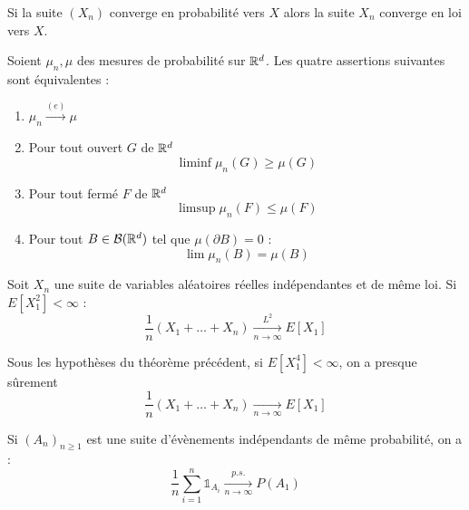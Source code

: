\documentclass{cours}
\begin{document}
        \begin{proposition}
            Si la suite $\left(X_{n}\right)$ converge en probabilité vers $X$ alors la suite $X_{n}$ converge en loi vers $X$. 
        \end{proposition}

        \begin{proposition}
            Soient $\mu_{n}, \mu$ des mesures de probabilité sur $\mathbb{R}^{d}$. Les quatre assertions suivantes sont équivalentes :
            \begin{enumerate}
                \item $\mu_{n} \xrightarrow{(e)} \mu$
                \item Pour tout ouvert $G$ de $\mathbb{R}^{d}$
                \[
                    \liminf \mu_{n}(G) \geq \mu(G)
                \]
                \item Pour tout fermé $F$ de $\mathbb{R}^{d}$
                \[
                    \limsup \mu_{n}(F) \leq \mu(F)
                \]
                \item Pour tout $B \in \mathcal{B}(\mathbb{R}^{d})$ tel que $\mu\left(\partial B\right) = 0$ : 
                \[
                    \lim \mu_{n}(B) = \mu(B)
                \]
            \end{enumerate} 
        \end{proposition}

        \begin{theorem}
            Soit $X_{n}$ une suite de variables aléatoires réelles indépendantes et de même loi. Si $E[X_{1}^{2}] < \infty$ : 
            \[
                \frac{1}{n}\left(X_{1} + \ldots + X_{n}\right) \xrightarrow[n \to \infty]{L^{2}} E[X_{1}]
            \]
        \end{theorem}
        
        \begin{proposition}
            Sous les hypothèses du théorème précédent, si $E\left[X_{1}^{4}\right] < \infty$, on a presque sûrement 
            \[
                \frac{1}{n}\left(X_{1} + \ldots + X_{n}\right) \xrightarrow[n \to \infty]{} E[X_{1}]
            \]
        \end{proposition}

        \begin{corollary}
            Si $\left(A_{n}\right)_{n \geq 1}$ est une suite d'évènements indépendants de même probabilité, on a : 
            \[
                \frac{1}{n}\sum_{i = 1}^{n}\mathds{1}_{A_{i}} \xrightarrow[n \to \infty]{p.s.} P(A_{1})
            \]
        \end{corollary}
\end{document}
